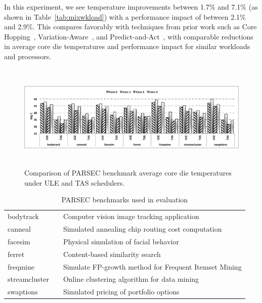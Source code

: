 \documentclass[times, 10pt,twocolumn]{IEEEtran}
\begin{document}
In this experiment, we see temperature improvements between
1.7\% and 7.1\% (as shown in Table~\ref{tab:mixwkload}) with a
performance impact of between 2.1\% and 2.9\%.  This compares favorably
with techniques from prior work such as Core Hopping~\cite{Choi2007},
Variation-Aware~\cite{Kursun2008}, and Predict-and-Act~\cite{Ayoub2009},
with comparable reductions in average core die temperatures and
performance impact for similar workloads and processors.

\newline
\begin{figure}[!tbp] 
\centering
  \includegraphics[width=1.0\linewidth,height=2in]{graphics/parsectemp}
  \caption{Comparison of PARSEC benchmark average core die temperatures
under ULE and TAS schedulers.}
  \label{fig:pbenchmarkt}
\end{figure}
\begin{table}[!b] 
\centering
  \caption{PARSEC benchmarks used in evaluation}
 \label{tab:parsecbench}
  \begin{tabular}[bthp]{l l p{5cm}} 
   \hline \hline 
bodytrack &  & Computer vision image tracking application \\
canneal &  & Simulated annealing chip routing cost computation \\
facesim &  & Physical simulation of facial behavior \\
ferret &  & Content-based similarity search \\
freqmine &  & Simulate FP-growth method for Frequent Itemset Mining \\
streamcluster &  & Online clustering algorithm for data mining \\
swaptions &  & Simulated pricing of portfolio options \\
\hline
\end{tabular}

\end{table}
\end{document}
